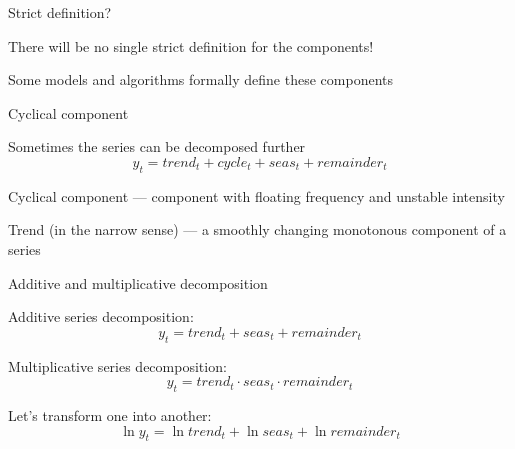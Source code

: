 \begin{frame}{Strict definition?}
	


	There will be no single strict definition for the components!
	
	\pause
	Some models and algorithms formally \alert{define} these components
	
\end{frame}

\begin{frame}{Cyclical component}
	
	Sometimes the series can be decomposed further
	\[
	y_t = trend_t + cycle_t + seas_t + remainder_t
	\]
	
	\pause
	\alert{Cyclical component} — component with floating frequency and unstable intensity
	
	
	\pause
	\alert{Trend} (in the narrow sense) — a smoothly changing monotonous component of a series
	
\end{frame}


\begin{frame}{Additive and multiplicative decomposition}
	
	
	\alert{Additive} series decomposition:
	\[
	y_t = trend_t + seas_t + remainder_t
	\]
	
	\pause
	\alert{Multiplicative} series decomposition:
	\[
	y_t = trend_t \cdot seas_t \cdot remainder_t
	\]
	
	\pause
	Let's transform one into another:
	\[
	\ln y_t = \ln trend_t + \ln seas_t + \ln remainder_t
	\]
\end{frame}


